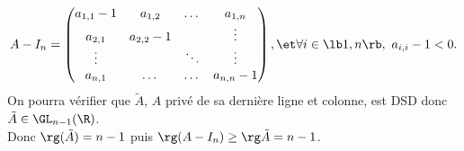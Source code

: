 \documentclass[11pt]{article}
\begin{document}
\begin{exercice}{}{}
    \begin{equation*}
        A-I_n = \begin{pmatrix}a_{1,1}-1 & a_{1,2} & \dots & a_{1,n} \\ a_{2,1} & a_{2,2}-1 & & \vdots \\ \vdots & & \ddots & \vdots \\ a_{n,1} & \dots & \dots & a_{n,n} - 1\end{pmatrix}, \et \forall i \in \lb1,n\rb, ~ a_{i,i} - 1 < 0.
    \end{equation*}
    On pourra vérifier que $\tilde{A}$, $A$ privé de sa dernière ligne et colonne, est DSD donc $\tilde{A}\in\GL_{n-1}(\R)$.\\
    Donc $\rg(\tilde{A})=n-1$ puis $\rg(A-I_n)\geq \rg\tilde{A}=n-1$.
\end{exercice}
\end{document}
